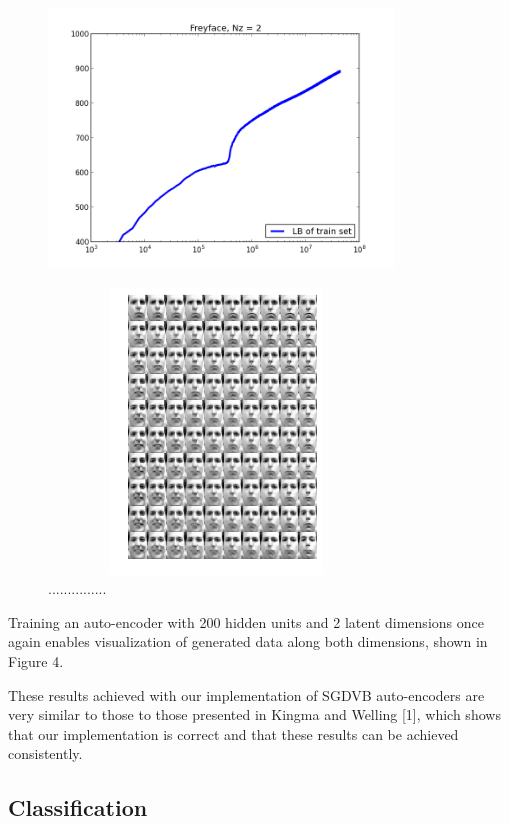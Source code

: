 \documentclass{article}
\begin{document}
\begin{figure}[htb]
\centering
\begin{minipage}{0.5\textwidth}
\includegraphics[height=3in,width=3.6in]{lowerboundFF.png}
\caption{...............}
\end{minipage}%
\centering
\begin{minipage}{0.5\textwidth}
\includegraphics[height=3in,width=3.5in]{manifoldFF.png}\caption{...............}
\end{minipage}
\end{figure}

Training an auto-encoder with 200 hidden units and 2 latent dimensions once again enables visualization of generated data along both dimensions, shown in Figure 4.

These results achieved with our implementation of SGDVB auto-encoders are very similar to those to those presented in Kingma and Welling [1], which shows that our implementation is correct and that these results can be achieved consistently. 

\subsection{Classification}
\end{document}
